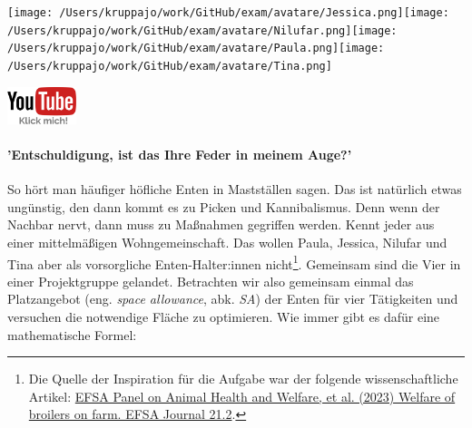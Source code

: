 \documentclass[a4paper, 9pt]{scrartcl}\usepackage[]{graphicx}\usepackage[]{xcolor}
\begin{document}
 
\ifcollection
\begin{flushright}
\tiny\vspace{-3Ex}
\textbf{\examinhaltstart}
\exammodulemathstat
\vspace{-4Ex}
\end{flushright}
\begin{minipage}[t]{0.5\textwidth}
\texttt{[image: /Users/kruppajo/work/GitHub/exam/avatare/Jessica.png]}\hspace{-4mm}\texttt{[image: /Users/kruppajo/work/GitHub/exam/avatare/Nilufar.png]}\hspace{-4mm}\texttt{[image: /Users/kruppajo/work/GitHub/exam/avatare/Paula.png]}\hspace{-4mm}\texttt{[image: /Users/kruppajo/work/GitHub/exam/avatare/Tina.png]}
\end{minipage}
\begin{minipage}[t]{0.5\textwidth}
\hfill
\href{https://youtu.be/n451XnhtSh4}{\includegraphics[width = 2cm]{img/youtube}}
\end{minipage}
\fi



\ifcollection
\paragraph{'Entschuldigung, ist das Ihre Feder in meinem Auge?'}
\fi



So hört man häufiger höfliche Enten in Mastställen sagen. Das ist natürlich etwas ungünstig, den dann kommt es zu Picken und Kannibalismus. Denn wenn der Nachbar nervt, dann muss zu Maßnahmen gegriffen werden. Kennt jeder aus einer mittelmäßigen Wohngemeinschaft. Das wollen Paula, Jessica, Nilufar und Tina aber als vorsorgliche Enten-Halter:innen nicht\footnote{Die Quelle der Inspiration für die Aufgabe war der folgende wissenschaftliche Artikel: \href{https://www.efsa.europa.eu/en/efsajournal/pub/7788}{EFSA Panel on Animal Health and Welfare, et al. (2023) Welfare of broilers on farm. EFSA Journal 21.2}.}. Gemeinsam sind die Vier in einer Projektgruppe gelandet. Betrachten wir also gemeinsam einmal das Platzangebot (eng. \textit{space allowance}, abk. \textit{SA}) der Enten für vier Tätigkeiten und versuchen die notwendige Fläche zu optimieren. Wie immer gibt es dafür eine mathematische Formel:
\end{document}
